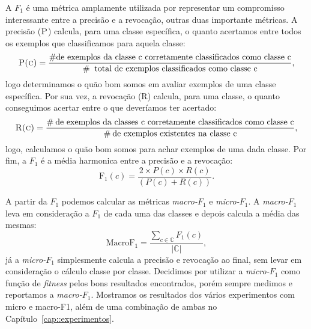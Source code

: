 A \textit{$F_1$} é uma métrica amplamente utilizada por representar um compromisso interessante entre a precisão e a revocação, outras duas importante métricas. A precisão ($\textsc{P}$) calcula, para uma classe específica, o quanto acertamos entre todos os exemplos que classificamos para aquela classe: 
\begin{equation}
\textsc{P(c)} = \frac{\# \text{de exemplos da classe c corretamente classificados como classe c}} {\# \: \text{ total de exemplos classificados como classe c}} \\,
\end{equation}
logo determinamos o quão bom somos em avaliar exemplos de uma classe específica. 
Por sua vez, a revocação (\textsc{R}) calcula, para uma classe, o quanto conseguimos acertar entre o que deveríamos ter acertado:
\begin{equation}
\textsc{R(c)} = \frac{\# \: \text{de exemplos da classes c corretamente classificados como classe c}}{\# \: \text{de exemplos existentes na classe c}},                      
\end{equation}
logo, calculamos o quão bom somos para achar exemplos de uma dada classe. 
Por fim, a \textit{$F_1$} é a média harmonica entre a precisão e a revocação:
\begin{equation}
\text{F}_1(c) = \frac{2 \times P(c) \times R(c)}{(P(c) + R(c))}.
\end{equation}

A partir da $F_1$ podemos calcular as métricas \textit{macro-$F_1$} e \textit{micro-$F_1$}. A \textit{macro-$F_1$} leva em consideração a $F_1$ de cada uma das classes e depois calcula a média das mesmas:
\begin{equation}
\text{MacroF}_1 = \frac{\sum\limits_{c \in \mathbb{C}} F_1(c) } { |\mathbb{C}| },
\end{equation}
já a \textit{micro-$F_1$} simplesmente calcula a precisão e revocação ao final, sem levar em consideração o cálculo classe por classe. Decidimos por utilizar a \textit{micro-$F_1$} como função de \textit{fitness} pelos bons resultados encontrados, porém sempre medimos e reportamos a \textit{macro-$F_1$}. Mostramos os resultados dos vários experimentos com micro e macro-F1, além de uma combinação de ambas no Capítulo~\ref{cap::experimentos}.

\algrenewcommand{}
\algrenewcommand{}
\algrenewcommand{}
\algrenewcommand{} %

